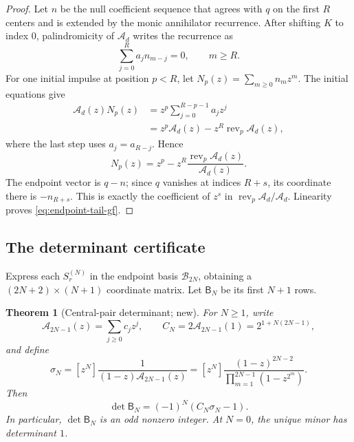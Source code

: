 \documentclass[11pt,oneside]{article}
\numberwithin{equation}{section}
\newtheorem{theorem}{Theorem}[section]
\theoremstyle{definition}
\theoremstyle{remark}
\newcommand{\rev}{\operatorname{rev}}
\begin{document}
\begin{proof}
Let $n$ be the null coefficient sequence that agrees with $q$ on the first
$R$ centers and is extended by the monic annihilator recurrence.  After
shifting $K$ to index $0$, palindromicity of $\mathcal A_d$ writes the
recurrence as
\[
 \sum_{j=0}^{R}a_jn_{m-j}=0,\qquad m\ge R.
\]
For one initial impulse at position $p<R$, let
$N_p(z)=\sum_{m\ge0}n_mz^m$.  The initial equations give
\begin{align*}
 \mathcal A_d(z)N_p(z)
 &=z^p\sum_{j=0}^{R-p-1}a_jz^j\\
 &=z^p\mathcal A_d(z)-z^R\rev_p\mathcal A_d(z),
\end{align*}
where the last step uses $a_j=a_{R-j}$.  Hence
\[
 N_p(z)=z^p-z^R\frac{\rev_p\mathcal A_d(z)}{\mathcal A_d(z)}.
\]
The endpoint vector is $q-n$; since $q$ vanishes at indices $R+s$, its
coordinate there is $-n_{R+s}$.  This is exactly the coefficient of $z^s$ in
$\rev_p\mathcal A_d/\mathcal A_d$.  Linearity proves
\eqref{eq:endpoint-tail-gf}.
\end{proof}

\subsection{The determinant certificate}

Express each $S_r^{(N)}$ in the endpoint basis $\mathcal B_{2N}$, obtaining a
$(2N+2)\times(N+1)$ coordinate matrix.  Let $\mathsf B_N$ be its first $N+1$
rows.

\begin{theorem}[Central-pair determinant; new]
\label{thm:central-determinant}
For $N\ge1$, write
\begin{equation}
 \mathcal A_{2N-1}(z)=\sum_{j\ge0}c_jz^j,
 \qquad C_N=2\mathcal A_{2N-1}(1)=2^{1+N(2N-1)},
 \label{eq:CN}
\end{equation}
and define
\begin{equation}
 \sigma_N=[z^N]\frac1{(1-z)\mathcal A_{2N-1}(z)}
 =[z^N]\frac{(1-z)^{2N-2}}
 {\prod_{m=1}^{2N-1}(1-z^{2^m})}.
 \label{eq:sigmaN}
\end{equation}
Then
\begin{equation}
 \boxed{
 \det\mathsf B_N=(-1)^N(C_N\sigma_N-1).}
 \label{eq:detBN}
\end{equation}
In particular, $\det\mathsf B_N$ is an odd nonzero integer.  At $N=0$, the
unique minor has determinant $1$.
\end{theorem}
\end{document}
